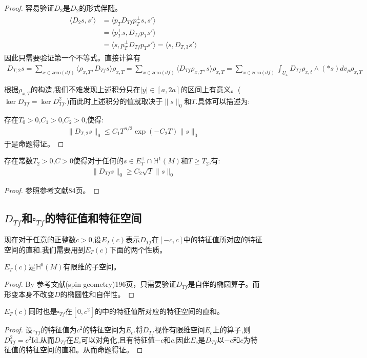 \begin{proof}
	容易验证$D_3$是$D_2$的形式伴随。
    \begin{align}
	\begin{split}
		\langle D_2s,s'\rangle &=\langle p_TD_{Tf}p_T^{\perp}s,s'\rangle \\
	 &=\langle p_T^{\perp}s,D_{Tf}p_Ts'\rangle\\
	 &=\langle s,p_T^{\perp}D_{Tf}p_Ts'\rangle=\langle s,D_{T,3}s'\rangle
	\end{split}
	\end{align}
	因此只需要验证第一个不等式。直接计算有
    \begin{align}
		D_{T,2}s=\sum_{x \in \mathrm{zero}(df)}\langle \rho_{x,T},D_{Tf}s\rangle\rho_{x,T}=\sum_{x \in \mathrm{zero}(df)}\langle D_{Tf}\rho_{x,T},s\rangle\rho_{x,T}=\sum_{x\in \mathrm{zero}(df)}\int_{U_x}D_{Tf}\rho_{x,t} \wedge (*s) dv_p \rho_{x,T}
	\end{align}
	
	根据$\rho_{x,T}$的构造,我们不难发现上述积分只在$|y|\in [a,2a]$的区间上有意义。($\ker D_{Tf}=\ker D_{Tf}^2$.)而此时上述积分的值就取决于$\|s\|_0$和$T$.具体可以描述为:

	存在$T_0>0$,$C_1>0$,$C_2>0$,使得:
	\begin{align}
		\|D_{T,2}s\|_0 \leq C_1T^{n/2}\exp(-C_2T)\|s\|_0
	\end{align}
	于是命题得证。
\end{proof}
\begin{proposition}\label{pro:D4}
	存在常数$T_2>0$,$C>0$使得对于任何的$s \in E_T^\perp \cap \mathbb{H}^1(M)$和$T\geq T_2$,有:
	\begin{align}
		\|D_{Tf}s\|_0\geq C_2\sqrt{T}\|s\|_0
	\end{align}
\end{proposition}
\begin{proof}
	参照参考文献84页。
\end{proof}
\subsection{$D_{Tf}$和$\square_{Tf}$的特征值和特征空间}
现在对于任意的正整数$c>0$,设$E_T(c)$表示$D_{Tf}$在$[-c,c]$中的特征值所对应的特征空间的直和.我们需要用到$E_T(c)$下面的两个性质。
\begin{proposition}
	$E_T(c)$是$\mathbb{H}^0(M)$有限维的子空间。
\end{proposition}
\begin{proof}
	By 参考文献(spin geometry)196页，只需要验证$D_{Tf}$是自伴的椭圆算子。而形变本身不改变$D$的椭圆性和自伴性。
\end{proof}
\begin{proposition}
	$E_T(c)$同时也是$\square_{Tf}$在$[0,c^2]$的中的特征值所对应的特征空间的直和。
\end{proposition}
\begin{proof}
	设$\square_{Tf}$的特征值为$c^2$的特征空间为$E_c$.将$D_{Tf}$视作有限维空间$E_c$上的算子,则$D_{Tf}^2=c^2\mathrm{Id}$.从而$D_{Tf}$在$E_c$可以对角化,且有特征值$-c$和$c$.因此$E_c$是$D_{Tf}$以$-c$和$c$为特征值的特征空间的直和。从而命题得证。
\end{proof}

